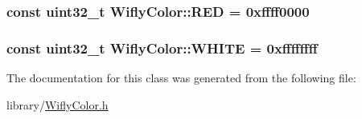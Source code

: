 \hypertarget{class_wifly_color_a9a00937bdf95435aa6e3e41ba5c6708b}{
\subsubsection[{R\-E\-D}]{\setlength{\rightskip}{0pt plus 5cm}const uint32\-\_\-t Wifly\-Color\-::\-R\-E\-D = 0xffff0000\hspace{0.3cm}{\ttfamily [static]}}}\label{class_wifly_color_a9a00937bdf95435aa6e3e41ba5c6708b}
\hypertarget{class_wifly_color_a746808c029beaa107b15296826f7e462}{
\subsubsection[{W\-H\-I\-T\-E}]{\setlength{\rightskip}{0pt plus 5cm}const uint32\-\_\-t Wifly\-Color\-::\-W\-H\-I\-T\-E = 0xffffffff\hspace{0.3cm}{\ttfamily [static]}}}\label{class_wifly_color_a746808c029beaa107b15296826f7e462}


The documentation for this class was generated from the following file\-:\begin{DoxyCompactItemize}
\item 
library/\hyperlink{_wifly_color_8h}{Wifly\-Color.\-h}\end{DoxyCompactItemize}
